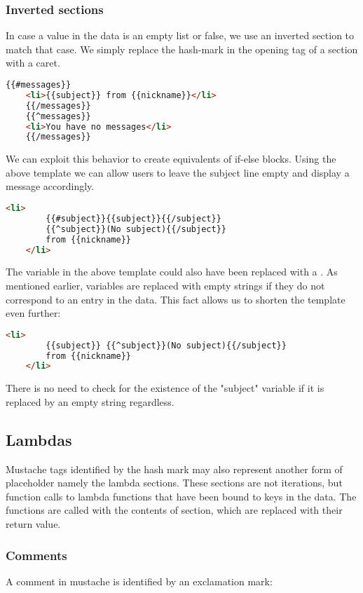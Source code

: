 \subsubsection{Inverted sections}
In case a value in the data is an empty list or false, we use an inverted
section to match that case. We simply replace the hash-mark in the opening tag
of a section with a caret.
\begin{lstlisting}[language=HTML]
	{{#messages}}
	<li>{{subject}} from {{nickname}}</li>
	{{/messages}}
	{{^messages}}
	<li>You have no messages</li>
	{{/messages}}
\end{lstlisting}

We can exploit this behavior to create equivalents of if-else blocks.
Using the above template we can allow users to leave the subject line empty
and display a message accordingly.
\begin{lstlisting}[language=HTML]
	<li>
		{{#subject}}{{subject}}{{/subject}}
		{{^subject}}(No subject){{/subject}}
		from {{nickname}}
	</li>
\end{lstlisting}

The  variable in the above template could also have been
replaced with a . As mentioned earlier, variables are replaced
with empty strings if they do not correspond to an entry in the data.
This fact allows us to shorten the template even further:
\begin{lstlisting}[language=HTML]
	<li>
		{{subject}} {{^subject}}(No subject){{/subject}}
		from {{nickname}}
	</li>
\end{lstlisting}

There is no need to check for the existence of the "subject" variable if it is
replaced by an empty string regardless.

\subsection{Lambdas}
Mustache tags identified by the hash mark may also represent another form of
placeholder namely the lambda sections. These sections are not iterations, but
function calls to lambda functions that have been bound to keys in the data.
The functions are called with the contents of section, which are replaced
with their return value.

\subsubsection{Comments}
A comment in mustache is identified by an exclamation mark:

